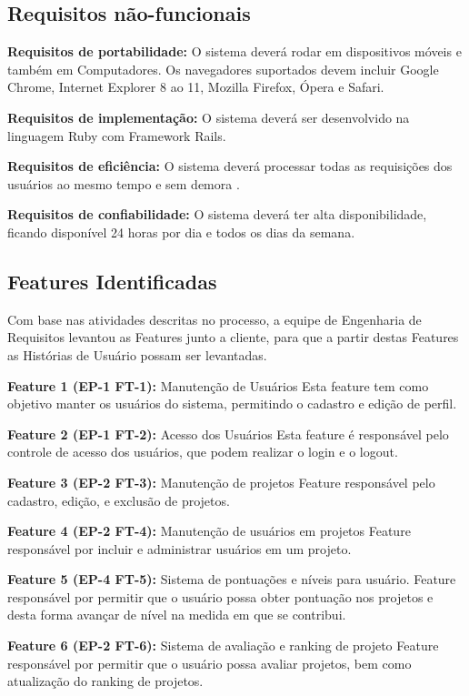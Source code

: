\subsection{Requisitos não-funcionais}

\textbf{Requisitos de portabilidade:} O sistema deverá rodar em dispositivos móveis e também em Computadores. Os navegadores suportados devem incluir Google Chrome, Internet Explorer 8 ao 11, Mozilla Firefox, Ópera e Safari.

\textbf{Requisitos de implementação:} O sistema deverá ser desenvolvido na linguagem Ruby com Framework Rails.

\textbf{Requisitos de eficiência:} O sistema deverá processar todas as requisições dos usuários ao mesmo tempo e sem demora .

\textbf{Requisitos de confiabilidade:} O sistema deverá ter alta disponibilidade, ficando disponível 24 horas por dia e todos os dias da semana.

\subsection{Features Identificadas}
Com base nas atividades descritas no processo, a equipe de Engenharia de Requisitos levantou as Features junto a cliente, para que a partir destas Features as Histórias de Usuário possam ser levantadas.

\textbf{Feature 1 (EP-1 FT-1):} Manutenção de Usuários
Esta feature tem como objetivo manter os usuários do sistema, permitindo o cadastro e edição de perfil.

\textbf{Feature 2 (EP-1 FT-2):} Acesso dos Usuários
Esta feature é responsável pelo controle de acesso dos usuários, que podem realizar o login e o logout.

\textbf{Feature 3 (EP-2 FT-3):} Manutenção de projetos
Feature responsável pelo cadastro, edição, e exclusão de projetos.

\textbf{Feature 4 (EP-2 FT-4):} Manutenção de usuários em projetos
Feature responsável por incluir e administrar usuários em um projeto.

\textbf{Feature 5 (EP-4 FT-5):} Sistema de pontuações e níveis para usuário.
Feature responsável por permitir que o usuário possa obter pontuação nos projetos e desta forma avançar de nível na medida em que se contribui.

\textbf{Feature 6 (EP-2 FT-6):} Sistema de avaliação e ranking de projeto
Feature responsável por permitir que o usuário possa avaliar projetos, bem como atualização do ranking de projetos.


